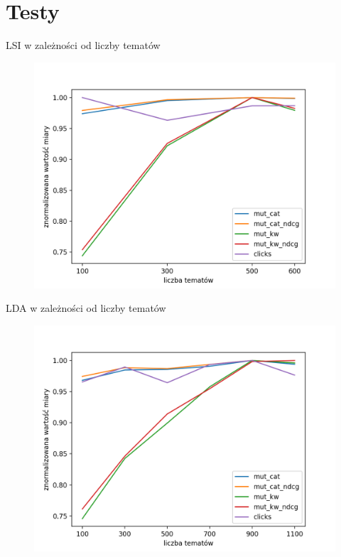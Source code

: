 \documentclass{beamer}
\begin{document}
	\section{Testy}
	\begin{frame}{LSI w zależności od liczby tematów}
		\begin{figure}[H]
			\centering
			\includegraphics[width=1\textwidth]{img/results/lsi_.png}
		\end{figure}
	\end{frame}
	\begin{frame}{LDA w zależności od liczby tematów}
		\begin{figure}[H]
			\centering
			\includegraphics[width=1\textwidth]{img/results/lda_.png}
		\end{figure}
	\end{frame}
\end{document}
